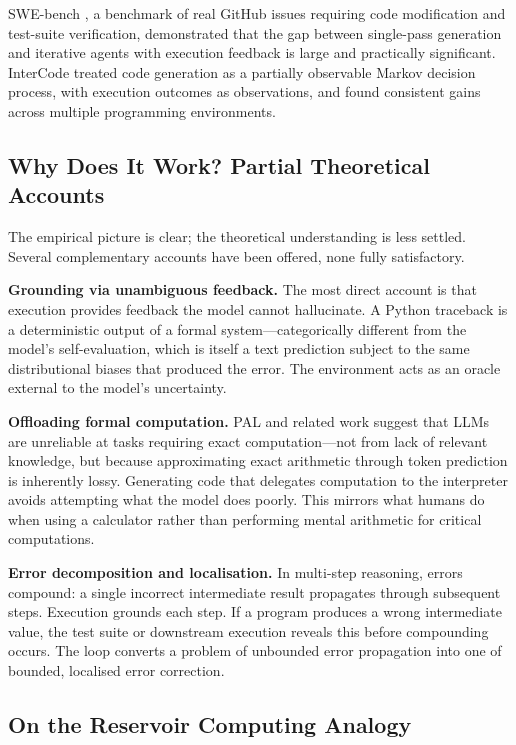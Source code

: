 \documentclass[10.5pt]{article}
\begin{document}
SWE-bench \cite{jimenez2024swebench}, a benchmark of real GitHub issues
requiring code modification and test-suite verification, demonstrated that the
gap between single-pass generation and iterative agents with execution feedback
is large and practically significant. InterCode \cite{yang2023intercode}
treated code generation as a partially observable Markov decision process, with
execution outcomes as observations, and found consistent gains across multiple
programming environments.

\subsection*{Why Does It Work? Partial Theoretical Accounts}

The empirical picture is clear; the theoretical understanding is less settled.
Several complementary accounts have been offered, none fully satisfactory.

\textbf{Grounding via unambiguous feedback.} The most direct account is that
execution provides feedback the model cannot hallucinate. A Python traceback is
a deterministic output of a formal system---categorically different from the
model's self-evaluation, which is itself a text prediction subject to the same
distributional biases that produced the error. The environment acts as an oracle
external to the model's uncertainty.

\textbf{Offloading formal computation.} PAL and related work suggest that LLMs
are unreliable at tasks requiring exact computation---not from lack of relevant
knowledge, but because approximating exact arithmetic through token prediction is
inherently lossy. Generating code that delegates computation to the interpreter
avoids attempting what the model does poorly. This mirrors what humans do when
using a calculator rather than performing mental arithmetic for critical
computations.

\textbf{Error decomposition and localisation.} In multi-step reasoning, errors
compound: a single incorrect intermediate result propagates through subsequent
steps. Execution grounds each step. If a program produces a wrong intermediate
value, the test suite or downstream execution reveals this before compounding
occurs. The loop converts a problem of unbounded error propagation into one of
bounded, localised error correction.

\subsection*{On the Reservoir Computing Analogy}
\end{document}
